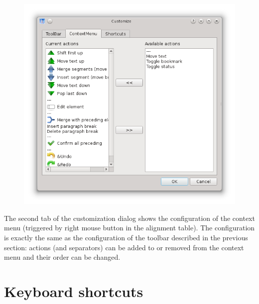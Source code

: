 \documentclass[a4paper,10pt,oneside]{book}
\begin{document}
\begin{figure}[htbf]
 \includegraphics[width=\textwidth]{screenshots/customize_contextmenu.png}
\end{figure}

The second tab of the customization dialog shows the configuration of the context menu (triggered by right mouse button in the alignment table). The configuration is exactly the same as the configuration of the toolbar described in the previous section: actions (and separators) can be added to or removed from the context menu and their order can be changed.

\section{Keyboard shortcuts}\label{ch:detail:custom:shortcuts}
\end{document}
